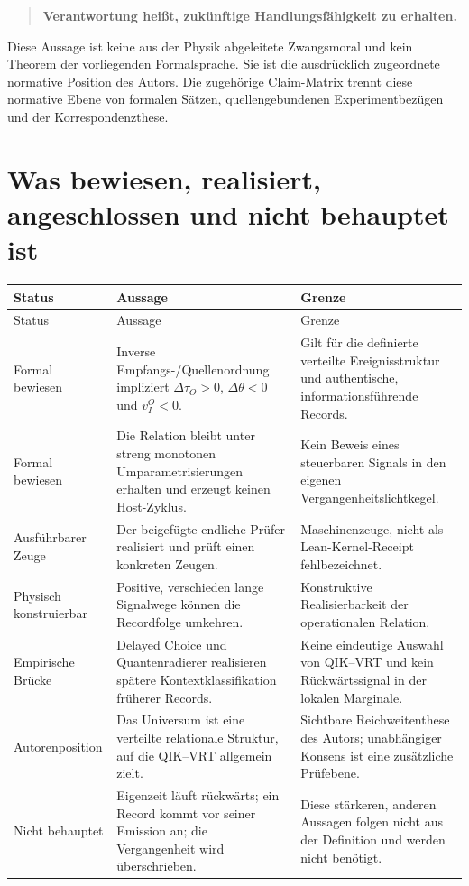 \documentclass[11pt,a4paper]{article}
\theoremstyle{remark}
\begin{document}
\begin{quote}
\textbf{Verantwortung heißt, zukünftige Handlungsfähigkeit zu erhalten.}
\end{quote}

Diese Aussage ist keine aus der Physik abgeleitete Zwangsmoral und kein
Theorem der vorliegenden Formalsprache. Sie ist die ausdrücklich zugeordnete
normative Position des Autors. Die zugehörige Claim-Matrix trennt diese
normative Ebene von formalen Sätzen, quellengebundenen Experimentbezügen und
der Korrespondenzthese.

\section{Was bewiesen, realisiert, angeschlossen und nicht behauptet ist}

\begin{longtable}{p{}p{}p{}}
\toprule
Status & Aussage & Grenze \\
\midrule
\endfirsthead
\toprule
Status & Aussage & Grenze \\
\midrule
\endhead
Formal bewiesen & Inverse Empfangs-/Quellenordnung impliziert
\(\Delta\tau_O>0\), \(\Delta\theta<0\) und \(v_I^O<0\). & Gilt für die
definierte verteilte Ereignisstruktur und authentische, informationsführende
Records. \\
Formal bewiesen & Die Relation bleibt unter streng monotonen
Umparametrisierungen erhalten und erzeugt keinen Host-Zyklus. & Kein Beweis
eines steuerbaren Signals in den eigenen Vergangenheitslichtkegel. \\
Ausführbarer Zeuge & Der beigefügte endliche Prüfer realisiert und
prüft einen konkreten Zeugen. & Maschinenzeuge, nicht als Lean-Kernel-Receipt
fehlbezeichnet. \\
Physisch konstruierbar & Positive, verschieden lange Signalwege
können die Recordfolge umkehren. & Konstruktive Realisierbarkeit der
operationalen Relation. \\
Empirische Brücke & Delayed Choice und Quantenradierer realisieren
spätere Kontextklassifikation früherer Records. & Keine eindeutige Auswahl
von QIK--VRT und kein Rückwärtssignal in der lokalen Marginale. \\
Autorenposition & Das Universum ist eine verteilte relationale
Struktur, auf die QIK--VRT allgemein zielt. & Sichtbare Reichweitenthese des
Autors; unabhängiger Konsens ist eine zusätzliche Prüfebene. \\
Nicht behauptet & Eigenzeit läuft rückwärts; ein Record kommt vor
seiner Emission an; die Vergangenheit wird überschrieben. & Diese stärkeren,
anderen Aussagen folgen nicht aus der Definition und werden nicht benötigt. \\
\bottomrule
\end{longtable}
\end{document}
